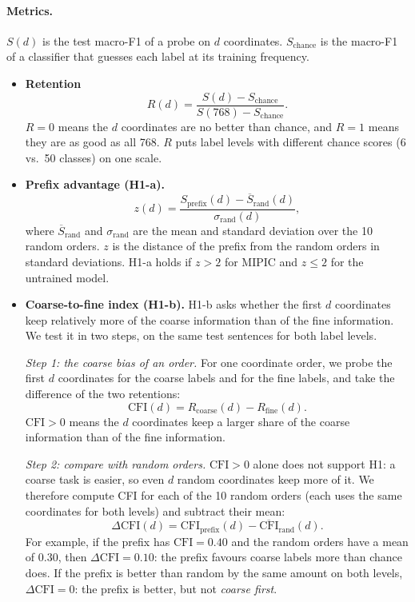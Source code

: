 \documentclass[11pt]{article}
\begin{document}
\paragraph{Metrics.}
$S(d)$ is the test macro-F1 of a probe on $d$ coordinates.
$S_{\text{chance}}$ is the macro-F1 of a classifier that guesses each label at its training frequency.
\begin{itemize}
  \item \textbf{Retention}
  \[
    R(d)=\frac{S(d)-S_{\text{chance}}}{S(768)-S_{\text{chance}}}.
  \]
  $R{=}0$ means the $d$ coordinates are no better than chance, and $R{=}1$ means they are as good as all 768.
  $R$ puts label levels with different chance scores (6 vs.\ 50 classes) on one scale.

  \item \textbf{Prefix advantage (H1-a).}
  \[
    z(d)=\frac{S_{\text{prefix}}(d)-\overline{S}_{\text{rand}}(d)}{\sigma_{\text{rand}}(d)},
  \]
  where $\overline{S}_{\text{rand}}$ and $\sigma_{\text{rand}}$ are the mean and standard deviation over the 10 random orders.
  $z$ is the distance of the prefix from the random orders in standard deviations.
  H1-a holds if $z>2$ for MIPIC and $z\le 2$ for the untrained model.

  \item \textbf{Coarse-to-fine index (H1-b).}
  H1-b asks whether the first $d$ coordinates keep relatively more of the coarse information than of the fine information.
  We test it in two steps, on the same test sentences for both label levels.

  \emph{Step 1: the coarse bias of an order.}
  For one coordinate order, we probe the first $d$ coordinates for the coarse labels and for the fine labels, and take the difference of the two retentions:
  \[
    \text{CFI}(d)=R_{\text{coarse}}(d)-R_{\text{fine}}(d).
  \]
  $\text{CFI}>0$ means the $d$ coordinates keep a larger share of the coarse information than of the fine information.

  \emph{Step 2: compare with random orders.}
  $\text{CFI}>0$ alone does not support H1: a coarse task is easier, so even $d$ random coordinates keep more of it.
  We therefore compute CFI for each of the 10 random orders (each uses the same coordinates for both levels) and subtract their mean:
  \[
    \Delta\text{CFI}(d)=\text{CFI}_{\text{prefix}}(d)-\overline{\text{CFI}}_{\text{rand}}(d).
  \]
  For example, if the prefix has $\text{CFI}=0.40$ and the random orders have a mean of $0.30$, then $\Delta\text{CFI}=0.10$: the prefix favours coarse labels more than chance does.
  If the prefix is better than random by the same amount on both levels, $\Delta\text{CFI}=0$: the prefix is better, but not \emph{coarse first}.


\end{itemize}
\end{document}
